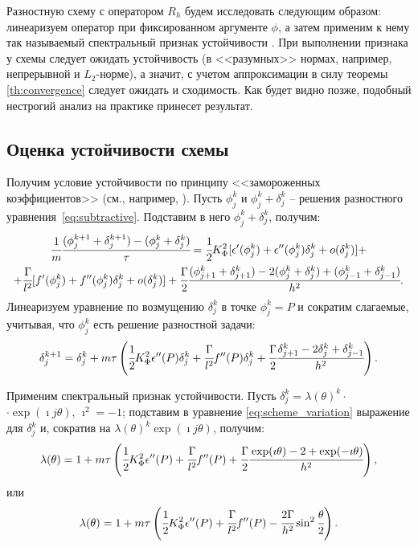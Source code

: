 Разностную схему с оператором $R_h$ будем исследовать следующим образом: линеаризуем оператор при фиксированном аргументе $\phi$, а затем применим к нему так называемый спектральный признак устойчивости \cite{bahvalov_computational_methods}. При выполнении признака у схемы следует ожидать устойчивость (в <<разумных>> нормах, например, непрерывной и $L_2$-норме), а значит, с учетом аппроксимации в силу теоремы \ref{th:convergence} следует ожидать и сходимость. Как будет видно позже, подобный нестрогий анализ на практике принесет результат.


\subsection{Оценка устойчивости схемы}

Получим условие устойчивости по принципу <<замороженных коэффициентов>> (см., например, \cite{bahvalov_computational_methods}). Пусть $\phi_j^k$ и $\phi_j^k + \delta_j^k$ -- решения разностного уравнения~\eqref{eq:subtractive}. Подставим в него $\phi_j^k + \delta_j^k$, получим:
\begin{multline*}
	\cfrac{1}{m} \cfrac{(\phi_j^{k + 1} + \delta_j^{k + 1}) - (\phi_j^k + \delta_j^k)}{\tau} = \cfrac{1}{2} K_\Phi^2 [\epsilon'(\phi_j^k) + \epsilon''(\phi_j^k) \delta_j^k + o(\delta_j^k)] + \\ + \cfrac{\Gamma}{l^2} [f'(\phi_j^k) + f''(\phi_j^k) \delta_j^k + o(\delta_j^k)] + \cfrac{\Gamma}{2} \cfrac{(\phi_{j + 1}^k + \delta_{j + 1}^k) - 2 (\phi_j^k + \delta_j^k) + (\phi_{j - 1}^k + \delta_{j - 1}^k)}{h^2} {\text{.}}
\end{multline*}
Линеаризуем уравнение по возмущению $\delta_j^k$ в точке $\phi_j^k = P$ и сократим слагаемые, учитывая, что $\phi_j^k$ есть решение разностной задачи:
\begin{equation}
	\delta_j^{k + 1} = \delta_j^k + m \tau \left( \cfrac{1}{2} K_\Phi^2 \epsilon''(P) \delta_j^k + \cfrac{\Gamma}{l^2} f''(P) \delta_j^k + \cfrac{\Gamma}{2} \cfrac{{\delta}_{j + 1}^k - 2 {\delta}_j^k + {\delta}_{j - 1}^k}{h^2} \right) {\text{.}}
	\label{eq:scheme_variation}
\end{equation} 

Применим спектральный признак устойчивости. Пусть $\delta_j^k = \lambda(\theta)^k \cdot$ \linebreak $\cdot \exp(\imath j \theta)$, $\imath^2 = -1$; подставим в уравнение \eqref{eq:scheme_variation} выражение для $\delta_j^k$ и, сократив на $\lambda(\theta)^k \exp(\imath j \theta)$, получим:
$$\lambda(\theta) = 1 + m \tau \left( \cfrac{1}{2} K_\Phi^2 \epsilon''(P) + \cfrac{\Gamma}{l^2} f''(P) + \cfrac{\Gamma}{2} \cfrac{\exp(\imath \theta) - 2 + \exp(-\imath \theta)}{h^2} \right) {\text{,}}$$
или
\begin{equation}
	\lambda(\theta) = 1 + m \tau \left( \cfrac{1}{2} K_\Phi^2 \epsilon''(P) + \cfrac{\Gamma}{l^2} f''(P) - \cfrac{2 \Gamma}{h^2} \sin^2 \cfrac{\theta}{2} \right) {\text{.}}
	\label{eq:spectral}
\end{equation}

